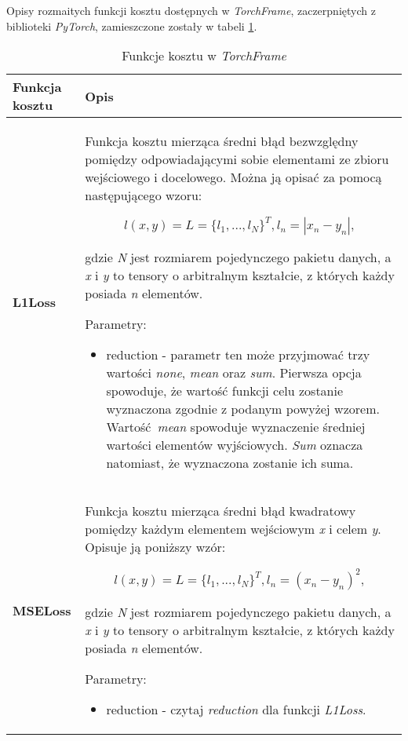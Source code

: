 \begin{enumerate}
    Opisy rozmaitych funkcji kosztu dostępnych w \textit{TorchFrame}, zaczerpniętych z biblioteki \textit{PyTorch},
    zamieszczone zostały w tabeli \ref{tab:cost_functions}.

    \begin{longtable}{ |m{2cm}|m{11cm}| }
      \caption{Funkcje kosztu w \textit{TorchFrame}}
      \label{tab:cost_functions}
      \endfirsthead
      \endhead
     \hline
       \textbf{Funkcja kosztu} & \textbf{Opis} \\

     \hline
       \textbf{L1Loss} &

       Funkcja kosztu mierząca średni błąd bezwzględny pomiędzy
       odpowiadającymi sobie elementami ze zbioru wejściowego i docelowego.
       Można ją opisać za pomocą następującego wzoru:

       \[l(x,y) = L = \{l_1,...,l_N\}^T, l_n = |x_n - y_n|,\]

       gdzie \textit{N} jest rozmiarem pojedynczego pakietu danych, a \textit{x} i
       \textit{y} to tensory o arbitralnym kształcie, z których każdy posiada
       \textit{n} elementów.

       Parametry:
       \begin{itemize}
       \item reduction - parametr ten może przyjmować trzy wartości \textit{none},
       \textit{mean} oraz \textit{sum}. Pierwsza opcja spowoduje, że wartość funkcji
       celu zostanie wyznaczona zgodnie z podanym powyżej wzorem. Wartość \textit{mean}
       spowoduje wyznaczenie średniej wartości elementów wyjściowych. \textit{Sum}
       oznacza natomiast, że wyznaczona zostanie ich suma.
       \end{itemize} \\

     \hline
       \textbf{MSELoss} &

       Funkcja kosztu mierząca średni błąd kwadratowy pomiędzy każdym elementem
       wejściowym \textit{x} i celem \textit{y}. Opisuje ją poniższy wzór:

       \[l(x,y) = L = \{l_1,...,l_N\}^T, l_n = (x_n - y_n)^2,\]

       gdzie \textit{N} jest rozmiarem pojedynczego pakietu danych, a \textit{x} i
       \textit{y} to tensory o arbitralnym kształcie, z których każdy posiada
       \textit{n} elementów.

       Parametry:
       \begin{itemize}
       \item reduction - czytaj \textit{reduction} dla funkcji \textit{L1Loss}.
       \end{itemize} \\


\end{longtable}
\end{enumerate}
